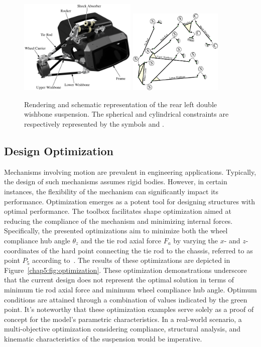 \begin{figure}[!ht]
  \centering
  \includegraphics[width=0.5\textwidth, trim={2cm 2cm 2.5cm 2cm}, clip]{./figures/chapter_5/rendering.eps}
  \includegraphics[width=0.4\textwidth]{./figures/chapter_5/constraints.eps}
  \caption{Rendering and schematic representation of the rear left double wishbone suspension. The spherical and cylindrical constraints are respectively represented by the symbols  and .}
  \label{chap5:fig:suspension}
\end{figure}

\subsection{Design Optimization}

Mechanisms involving motion are prevalent in engineering applications. Typically, the design of such mechanisms assumes rigid bodies. However, in certain instances, the flexibility of the mechanism can significantly impact its performance. Optimization emerges as a potent tool for designing structures with optimal performance. The \TrussMe{} toolbox facilitates shape optimization aimed at reducing the compliance of the mechanism and minimizing internal forces. Specifically, the presented optimizations aim to minimize both the wheel compliance hub angle $\theta_z$ and the tie rod axial force $F_a$ by varying the $x$- and $z$- coordinates of the hard point connecting the tie rod to the chassis, referred to as point $P_5$ according to~\cite{larcher2024symbolic}. The results of these optimizations are depicted in Figure~\ref{chap5:fig:optimization}. These optimization demonstrations underscore that the current design does not represent the optimal solution in terms of minimum tie rod axial force and minimum wheel compliance hub angle. Optimum conditions are attained through a combination of values indicated by the green point. It's noteworthy that these optimization examples serve solely as a proof of concept for the model's parametric characteristics. In a real-world scenario, a multi-objective optimization considering compliance, structural analysis, and kinematic characteristics of the suspension would be imperative.

